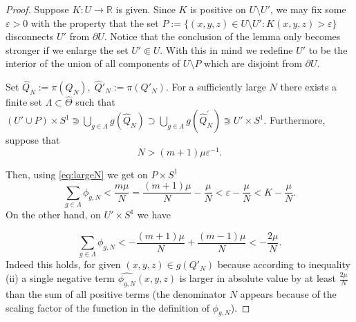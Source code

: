 \documentclass[12pt]{paper}
\theoremstyle{plain}
\theoremstyle{definition}
\newcommand{\wh}{\widehat}
\newcommand{\p}{\partial}
\newcommand{\eps}{\varepsilon}
\newcommand{\R}{{\mathbb{R}}}
\numberwithin{figure}{section}
\begin{document}
 \begin{proof}
 Suppose $K\colon U \to \R$ is given. Since $K$ is positive on $U \setminus U'$, we may fix some $\eps > 0$ with the property that the set $P := \{(x,y,z) \in U \setminus U': K(x,y,z) > \eps\}$ disconnects $U'$ from $\p U$. Notice that the conclusion of the lemma only becomes stronger if we enlarge the set $U' \Subset U$. With this in mind we redefine $U'$ to be the interior of the union of all components of $U \setminus P$ which are disjoint from $\p U$.

Set $\wh Q_N:= \pi(Q_N),\;\wh Q'_N:= \pi(Q'_N)$. For a sufficiently large $N$ there exists a finite set $  \Lambda\subset\wh\Theta$ such that $(U' \cup P) \times S^1\Supset \bigcup \limits_{g\in \Lambda}g(\wh Q_N) \supset \bigcup \limits_{g\in \Lambda}g(\wh Q^\prime_N) \Supset U' \times S^1$.  Furthermore, suppose that
  \begin{equation}\label{eq:largeN}
  N> (m+1)\mu\eps^{-1}   .
  \end{equation}

 
 Then, using  \eqref{eq:largeN} we get on $P \times S^1$
 $$  \sum\limits_{g\in \Lambda}\phi_{g,N} <   \frac{m \mu}N  = \frac{(m+1) \mu}N -\frac\mu N  < \eps-\frac\mu N <K-\frac\mu N.$$
On the other hand, on $U'\times S^1$ we have

$$
  \sum\limits_{g\in\Lambda}\phi_{g,N} <-\frac{(m+1)\mu}N + \frac{(m-1)\mu}N  < - \frac{2\mu} N.
$$
  Indeed this holds, for given $(x,y,z) \in g(Q'_N)$  because
  according to inequality (ii) a single negative term $\wh{\phi_{g,N}}(x,y,z)$ is  larger in absolute value by at least $\frac{2\mu}N$ than the sum of all   positive terms  (the denominator $N$ appears because of the scaling factor of the function in the definition of  $\phi_{g,N}$).
\end{proof}
  
\end{document}
